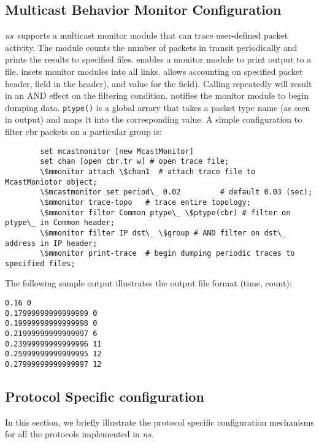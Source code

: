 \subsection{Multicast Behavior Monitor Configuration}
\emph{ns}\ supports a multicast monitor module that can trace
user-defined packet activity.
The module counts the number of packets in transit periodically
and prints the results to specified files.  enables a 
monitor module to print output to a file. 
 insets monitor modules into all links. 
 allows accounting on specified packet header, 
field in the header), and value for the field).  Calling 
repeatedly will result in an AND effect on the filtering condition.
 notifies the monitor module to begin dumping data.
{\tt ptype()} is a global arrary that takes a packet type name (as seen in
 output) and maps it into the corresponding value.  
A simple configuration to filter cbr packets on a particular group is:

\begin{verbatim}
        set mcastmonitor [new McastMonitor]
        set chan [open cbr.tr w] # open trace file;
        \$mmonitor attach \$chan1  # attach trace file to McastMoniotor object;
        \$mcastmonitor set period\_ 0.02         # default 0.03 (sec);
        \$mmonitor trace-topo   # trace entire topology;
        \$mmonitor filter Common ptype\_ \$ptype(cbr) # filter on ptype\_ in Common header;
        \$mmonitor filter IP dst\_ \$group # AND filter on dst\_ address in IP header;
        \$mmonitor print-trace  # begin dumping periodic traces to specified files;

\end{verbatim} %

The following sample output illustrates the output file format (time, count):
{\small
\begin{verbatim}
0.16 0
0.17999999999999999 0
0.19999999999999998 0
0.21999999999999997 6
0.23999999999999996 11
0.25999999999999995 12
0.27999999999999997 12
\end{verbatim}
}

\subsection{Protocol Specific configuration}

In this section, we briefly illustrate the
protocol specific configuration mechanisms
for all the protocols implemented in \emph{ns}.

